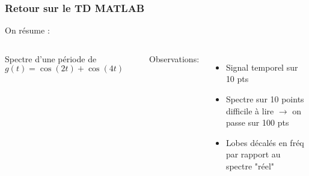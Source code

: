 \documentclass{beamer}
\begin{document}
\begin{frame}
\frametitle{Retour sur le TD MATLAB}
On résume  :\\
\vspace{0.2cm}
\begin{columns}
\column{60mm}
Spectre d'une période de $g(t) = \cos(2t)+\cos(4t)$
\vspace{0.2cm}
\begin{center}
\end{center}
\column{60mm}
Observations: \\
\vspace{0.3cm}
\begin{itemize}
\item<2-> Signal temporel sur 10 pts
\vspace{0.3 cm}
\item<3-> Spectre sur 10 points difficile à lire $\rightarrow$ on passe sur 100 pts
\vspace{0.3 cm}
\item<4-> Lobes décalés en fréq par rapport au spectre "réel"
\end{itemize}
\vspace{0.3 cm}
\end{columns}
\end{frame}
\end{document}
